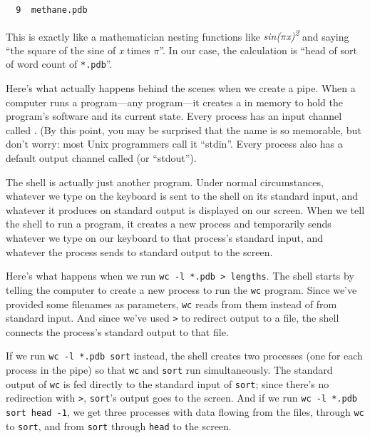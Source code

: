 \documentclass{book}
\begin{document}
\begin{verbatim}
  9  methane.pdb
\end{verbatim}

This is exactly like a mathematician nesting functions like
\emph{sin($\pi$x)\textsuperscript{2}} and saying ``the square of the sine of
\emph{x} times $\pi$''. In our case, the calculation is ``head of sort of
word count of \texttt{*.pdb}''.

Here's what actually happens behind the scenes when we create a pipe.
When a computer runs a program---any program---it creates a
 in memory to hold the program's software
and its current state. Every process has an input channel called
. (By this point, you may be
surprised that the name is so memorable, but don't worry: most Unix
programmers call it ``stdin''. Every process also has a default output
channel called  (or
``stdout'').

The shell is actually just another program. Under normal circumstances,
whatever we type on the keyboard is sent to the shell on its standard
input, and whatever it produces on standard output is displayed on our
screen. When we tell the shell to run a program, it creates a new
process and temporarily sends whatever we type on our keyboard to that
process's standard input, and whatever the process sends to standard
output to the screen.

Here's what happens when we run
\texttt{wc -l *.pdb \textgreater{} lengths}. The shell starts by telling
the computer to create a new process to run the \texttt{wc} program.
Since we've provided some filenames as parameters, \texttt{wc} reads
from them instead of from standard input. And since we've used
\texttt{\textgreater{}} to redirect output to a file, the shell connects
the process's standard output to that file.

If we run \texttt{wc -l *.pdb \textbar{} sort} instead, the shell
creates two processes (one for each process in the pipe) so that
\texttt{wc} and \texttt{sort} run simultaneously. The standard output of
\texttt{wc} is fed directly to the standard input of \texttt{sort};
since there's no redirection with \texttt{\textgreater{}},
\texttt{sort}'s output goes to the screen. And if we run
\texttt{wc -l *.pdb \textbar{} sort \textbar{} head -1}, we get three
processes with data flowing from the files, through \texttt{wc} to
\texttt{sort}, and from \texttt{sort} through \texttt{head} to the
screen.
\end{document}
